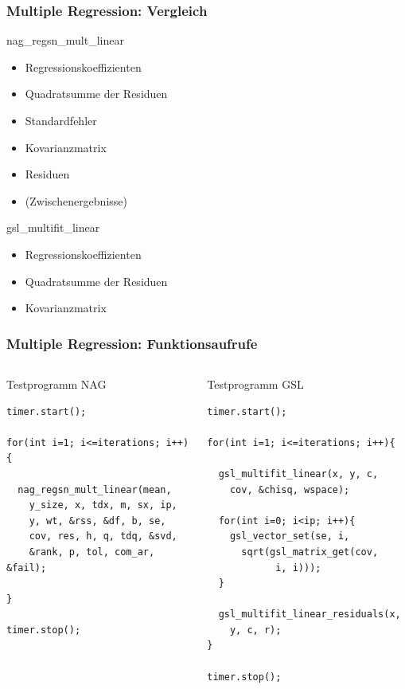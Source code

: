\documentclass{beamer}
\begin{document}
\begin{frame}
  \frametitle{Multiple Regression: Vergleich}
  
  \begin{block}{nag\_regsn\_mult\_linear}
    \begin{itemize}
    \item Regressionskoeffizienten
    \item Quadratsumme der Residuen
    \item Standardfehler
    \item Kovarianzmatrix
    \item Residuen
    \item (Zwischenergebnisse)
    \end{itemize}
  \end{block}
  
  \begin{block}{gsl\_multifit\_linear}
    \begin{itemize}
    \item Regressionskoeffizienten
    \item Quadratsumme der Residuen
    \item Kovarianzmatrix
    \end{itemize}
  \end{block}

\end{frame}

\begin{frame}[fragile]
  \frametitle{Multiple Regression: Funktionsaufrufe}
  
  \begin{columns}
    \begin{block}{Testprogramm NAG}
      \begin{lstlisting}
timer.start();

for(int i=1; i<=iterations; i++){
  
  nag_regsn_mult_linear(mean, 
    y_size, x, tdx, m, sx, ip, 
    y, wt, &rss, &df, b, se,
    cov, res, h, q, tdq, &svd, 
    &rank, p, tol, com_ar, &fail);

}

timer.stop();
      \end{lstlisting}
    \end{block}
    \begin{block}{Testprogramm GSL}
      \begin{lstlisting}
timer.start();

for(int i=1; i<=iterations; i++){    
  
  gsl_multifit_linear(x, y, c, 
    cov, &chisq, wspace);
  
  for(int i=0; i<ip; i++){
    gsl_vector_set(se, i, 
      sqrt(gsl_matrix_get(cov, 
            i, i)));
  }
    
  gsl_multifit_linear_residuals(x, 
    y, c, r);
}

timer.stop();
\end{lstlisting}
\end{block}    
\end{columns}

\end{frame}
\end{document}
